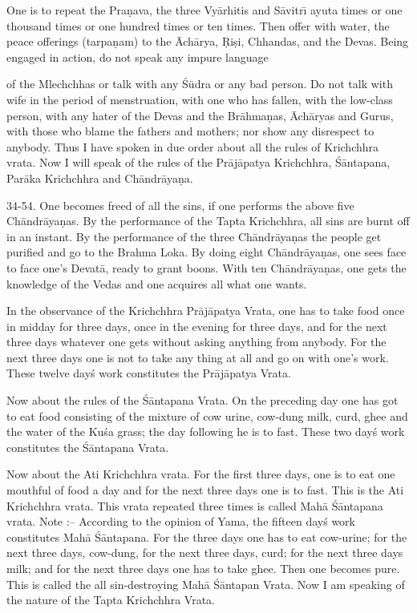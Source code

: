 One is to repeat the Pra\d{n}ava, the three Vy\=arhitis and S\=avitr\={\i} ayuta times or one thousand times or one hundred times or ten times. Then offer with water, the peace offerings (tarpa\d{n}am) to the \=Ach\=arya, \d{R}i\d{s}i, Chhandas, and the Devas. Being engaged in action, do not speak any impure language

of the Mlechchhas or talk with any \'S\=udra or any bad person. Do not talk with wife in the period of menstruation, with one who has fallen, with the low-class person, with any hater of the Devas and the Br\=ahma\d{n}as, \=Ach\=aryas and Gurus, with those who blame the fathers and mothers; nor show any disrespect to anybody. Thus I have spoken in due order about all the rules of Krichchhra vrata. Now I will speak of the rules of the Pr\=aj\=apatya Krichchhra, \'S\=antapana, Par\=aka Krichchhra and Ch\=andr\=aya\d{n}a.

34-54. One becomes freed of all the sins, if one performs the above five Ch\=andr\=aya\d{n}as. By the performance of the Tapta Krichchhra, all sins are burnt off in an instant. By the performance of the three Ch\=andr\=aya\d{n}as the people get purified and go to the Brahma Loka. By doing eight Ch\=andr\=aya\d{n}as, one sees face to face one's Devat\=a, ready to grant boons. With ten Ch\=andr\=aya\d{n}as, one gets the knowledge of the Vedas and one acquires all what one wants.

In the observance of the Krichchhra Pr\=aj\=apatya Vrata, one has to take food once in midday for three days, once in the evening for three days, and for the next three days whatever one gets without asking anything from anybody. For the next three days one is not to take any thing at all and go on with one's work. These twelve day\'s work constitutes the Pr\=aj\=apatya Vrata.

Now about the rules of the \'S\=antapana Vrata. On the preceding day one has got to eat food consisting of the mixture of cow urine, cow-dung milk, curd, ghee and the water of the Ku\'sa grass; the day following he is to fast. These two day\'s work constitutes the \'S\=antapana Vrata.

Now about the Ati Krichchhra vrata. For the first three days, one is to eat one mouthful of food a day and for the next three days one is to fast. This is the Ati Krichchhra vrata. This vrata repeated three times is called Mah\=a \'S\=antapana vrata. Note :-- According to the opinion of Yama, the fifteen day\'s work constitutes Mah\=a \'S\=antapana. For the three days one has to eat cow-urine; for the next three days, cow-dung, for the next three days, curd; for the next three days milk; and for the next three days one has to take ghee. Then one becomes pure. This is called the all sin-destroying Mah\=a \'S\=antapan Vrata. Now I am speaking of the nature of the Tapta Krichchhra Vrata.

